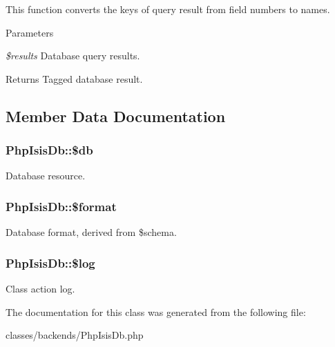 This function converts the keys of query result from field numbers to names.


\begin{DoxyParams}{Parameters}
\item[{\em \$results}]Database query results.\end{DoxyParams}
\begin{DoxyReturn}{Returns}
Tagged database result. 
\end{DoxyReturn}


\subsection{Member Data Documentation}
\hypertarget{classPhpIsisDb_a536e4c67dda71a7c7dad9ffbac299f9b}{
\subsubsection[{\$db}]{\setlength{\rightskip}{0pt plus 5cm}PhpIsisDb::\$db}}
\label{classPhpIsisDb_a536e4c67dda71a7c7dad9ffbac299f9b}
Database resource. \hypertarget{classPhpIsisDb_a275e29f3711d37fc67cea340b564ddf3}{
\subsubsection[{\$format}]{\setlength{\rightskip}{0pt plus 5cm}PhpIsisDb::\$format}}
\label{classPhpIsisDb_a275e29f3711d37fc67cea340b564ddf3}
Database format, derived from \$schema. \hypertarget{classPhpIsisDb_a0742105b3efab477fda99cd0561f98c7}{
\subsubsection[{\$log}]{\setlength{\rightskip}{0pt plus 5cm}PhpIsisDb::\$log}}
\label{classPhpIsisDb_a0742105b3efab477fda99cd0561f98c7}
Class action log. 

The documentation for this class was generated from the following file:\begin{DoxyCompactItemize}
\item 
classes/backends/PhpIsisDb.php\end{DoxyCompactItemize}
